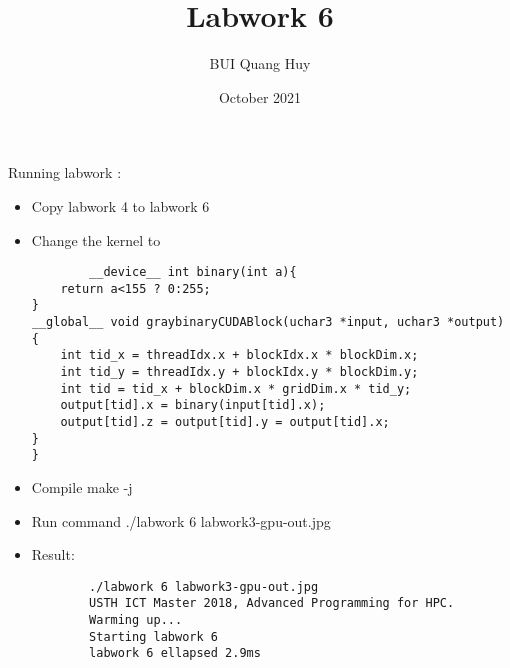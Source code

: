\documentclass{article}
\title{Labwork 6}
\author{BUI Quang Huy}
\date{October 2021}
\begin{document}
\maketitle

Running labwork :
\begin{itemize}
    \item Copy labwork 4 to labwork 6
    \item Change the kernel to 
    \begin{lstlisting}
        __device__ int binary(int a){
    return a<155 ? 0:255;
}
__global__ void graybinaryCUDABlock(uchar3 *input, uchar3 *output) {
    int tid_x = threadIdx.x + blockIdx.x * blockDim.x;
    int tid_y = threadIdx.y + blockIdx.y * blockDim.y;
    int tid = tid_x + blockDim.x * gridDim.x * tid_y;
    output[tid].x = binary(input[tid].x);
    output[tid].z = output[tid].y = output[tid].x;
}
}
    \end{lstlisting}
    \item Compile make -j
    \item Run command ./labwork 6 labwork3-gpu-out.jpg
    \item Result:\begin{lstlisting}
        ./labwork 6 labwork3-gpu-out.jpg           
        USTH ICT Master 2018, Advanced Programming for HPC.
        Warming up...
        Starting labwork 6
        labwork 6 ellapsed 2.9ms
    \end{lstlisting}
\end{itemize}
\end{document}
